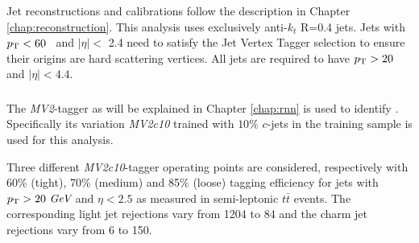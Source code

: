 %
%
%

Jet reconstructions and calibrations follow the description in Chapter \ref{chap:reconstruction}.
This analysis uses exclusively anti-$k_t$ R=0.4 jets.
Jets with $p_{{\rm T}} < 60$ \GeV~and $|\eta| <$ 2.4 need to satisfy the
Jet Vertex Tagger selection to ensure their origins are hard scattering vertices.
All jets are required to have $p_{{\rm T}}>20$ \GeV and $|\eta|<4.4$.


\subsubsection{\bjets}

\label{sec:vbf-btagging}
The {\it MV2}-tagger as will be explained in Chapter \ref{chap:rnn} is used to identify \bjets. Specifically its variation {\it MV2c10} trained with $10\%$ $c$-jets in the training sample is used for this analysis.


Three different {\it MV2c10}-tagger operating points are considered, respectively with 60\% (tight), 70\% (medium) and 85\% (loose) tagging efficiency for jets
with $p_{{\rm T}} > 20~\textit{GeV}{}$ and $\eta < 2.5$ as measured in semi-leptonic $t\bar{t}$ events. The corresponding light jet rejections vary from 1204 to 84 and the charm jet rejections vary from 6 to 150.

